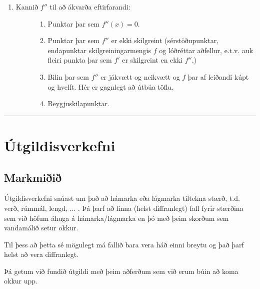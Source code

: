 \documentclass[b5paper,10pt,icelandic]{sphinxmanual}
\begin{document}
\begin{enumerate}
\begin{description}
\begin{enumerate}
\end{enumerate}

\end{description}

\item {} \begin{description}
\item[{Kannið \(f''\) til að ákvarða eftirfarandi:}] \leavevmode\begin{enumerate}
\item {} 
Punktar þar sem \(f''(x)=0\).

\item {} 
Punktar þar sem \(f''\) er ekki skilgreint (sérstöðupunktar, endapunktar skilgreiningarmengis \(f\) og lóðréttar aðfellur, e.t.v. auk fleiri punkta þar sem \(f'\) er skilgreint en ekki \(f''\).)

\item {} 
Bilin þar sem \(f''\) er jákvætt og neikvætt og \(f\) þar af leiðandi kúpt og hvelft. Hér er gagnlegt að útbúa töflu.

\item {} 
Beygjuskilapunktar.

\end{enumerate}

\end{description}

\end{enumerate}


\bigskip\hrule{}\bigskip

\newpage
{}

\section{Útgildisverkefni}
\label{kafli05:utgildisverkefni}\label{kafli05:index-5}

\subsection{Markmiðið}
\label{kafli05:markmii}
Útgildisverkefni snúast um það að hámarka eða lágmarka tiltekna stærð, t.d.
verð, rúmmál, lengd, ... . Þá þarf að finna (helst diffranlegt) fall fyrir stærðina
sem við höfum áhuga á hámarka/lágmarka en þó með þeim skorðum sem vandamálið setur okkur.

Til þess að þetta sé mögulegt má fallið bara vera háð einni breytu og
það þarf helst að vera diffranlegt.

Þá getum við fundið útgildi með þeim aðferðum sem við erum búin að koma
okkur upp.
\end{document}
